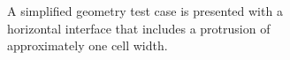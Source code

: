 \begin{figure}[htbp]
	\centering
	\begin{subfigure}{0.3\textwidth}
		\caption{A simplified geometry test case is presented with a horizontal interface that includes a protrusion of approximately one cell width.}
		\label{fig:0}
	\end{subfigure}%
\hfill
	\begin{subfigure}{0.3\textwidth}

\end{subfigure}
\end{figure}
